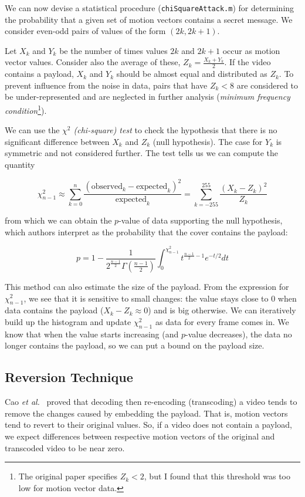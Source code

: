 \documentclass[12pt,british,twoside,notitlepage,usenames,dvipsnames,hypens,final]{report}
\numberwithin{equation}{section}
\numberwithin{figure}{section}
\begin{document}
We can now devise a statistical procedure (\texttt{chiSquareAttack.m}) for determining the probability that a given set of motion vectors contains a secret message. We consider even-odd pairs of values of the form $(2k, 2k+1)$. 

Let $X_k$ and $Y_k$ be the number of times values $2k$ and $2k+1$ occur as motion vector values. Consider also the average of these, $Z_k = \frac{X_k + Y_k}{2}$. If the video contains a payload, $X_k$ and $Y_k$ should be almost equal and distributed as $Z_k$. To prevent influence from the noise in data, pairs that have $Z_k < 8$ are considered to be under-represented and are neglected in further analysis (\emph{minimum frequency condition}\footnote{The original paper specifies $Z_k < 2$, but I found that this threshold was too low for motion vector data.}).

We can use the \emph{$\chi^2$ (chi-square) test} to check the hypothesis that there is no significant difference between $X_k$ and $Z_k$ (null hypothesis). The case for $Y_k$ is symmetric and not considered further. The test tells us we can compute the quantity

$$ \chi^2_{n-1} \approx \sum^{n}_{k=0} \frac{(\text{observed}_k - \text{expected}_k)^2}{\text{expected}_k}= \sum^{255}_{k=-255} \frac{(X_k - Z_k)^2}{Z_k} $$ 

from which we can obtain the $p$-value of data supporting the null hypothesis, which authors interpret as the probability that the cover contains the payload:

$$ p = 1 - \frac{1}{2^{\frac{n-1}{2}}\Gamma(\frac{n-1}{2})}\int_0^{\chi^2_{n-1}}t^{\frac{n-1}{2}−1}e^{-t/2}dt $$  

This method can also estimate the size of the payload. From the expression for $\chi^2_{n-1}$, we see that it is sensitive to small changes: the value stays close to 0 when data contains the payload ($X_k - Z_k \approx 0$) and is big otherwise. We can iteratively build up the histogram and update $\chi^2_{n-1}$ as data for every frame comes in. We know that when the value starts increasing (and $p$-value decreases), the data no longer contains the payload, so we can put a bound on the payload size. 

\subsection{Reversion Technique}
\label{rev-tech-theory}
Cao \emph{et al.}~\cite{cao2012video} proved that decoding then re-encoding (transcoding) a video tends to remove the changes caused by embedding the payload. That is, motion vectors tend to revert to their original values. So, if a video does not contain a payload, we expect differences between respective motion vectors of the original and transcoded video to be near zero.
\end{document}
